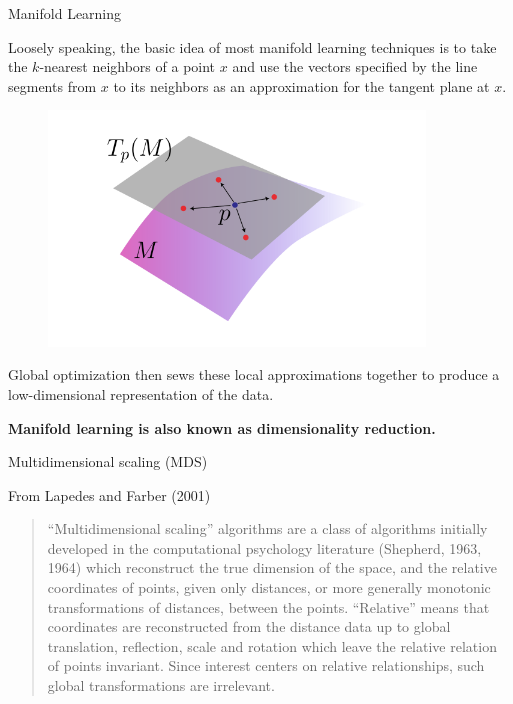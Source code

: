 \documentclass{beamer}
\begin{document}
\begin{frame}{Manifold Learning }
	
	Loosely speaking, the basic idea of most manifold learning techniques is to take the $k$-nearest neighbors of a point $x$ and use the vectors specified by the line segments from $x$ to its neighbors as an approximation for the tangent plane at $x$. 

	\begin{figure}[h]
	\centering
	\includegraphics[width=10cm]{../../Figures/fig_manifod_mds.png}
\end{figure}	
	
	Global optimization then sews these local approximations together to produce a low-dimensional representation of the data. 
	
\begin{center}
\textbf{Manifold learning is also known as dimensionality reduction.} 
\end{center}
\end{frame}



\begin{frame}{Multidimensional scaling (MDS)}
	
From Lapedes and Farber (2001)
\begin{quote}
	``Multidimensional scaling'' algorithms are a class of algorithms
	initially developed in the computational psychology literature (Shepherd, 1963, 1964) which reconstruct the true dimension of the space, and the
	relative coordinates of points, given only distances, or more generally monotonic transformations of distances, between the points. ``Relative''
	means that coordinates are reconstructed from
	the distance data up to global translation, reflection, scale and rotation which leave the relative
	relation of points invariant. Since interest centers
	on relative relationships, such global transformations are irrelevant.
\end{quote}
	
\end{frame}
\end{document}
